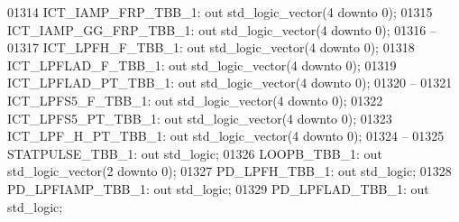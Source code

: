 \begin{DoxyCode}
01314         ICT\_IAMP\_FRP\_TBB\_1: \textcolor{keywordflow}{out} \textcolor{comment}{std\_logic\_vector}(\textcolor{vhdllogic}{}\textcolor{vhdllogic}{4} \textcolor{keywordflow}{downto} \textcolor{vhdllogic}{}\textcolor{vhdllogic}{0});
01315         ICT\_IAMP\_GG\_FRP\_TBB\_1:  \textcolor{keywordflow}{out} \textcolor{comment}{std\_logic\_vector}(\textcolor{vhdllogic}{}\textcolor{vhdllogic}{4} \textcolor{keywordflow}{downto} \textcolor{vhdllogic}{}\textcolor{vhdllogic}{0});
01316 \textcolor{keyword}{        --}
01317         ICT\_LPFH\_F\_TBB\_1:   \textcolor{keywordflow}{out} \textcolor{comment}{std\_logic\_vector}(\textcolor{vhdllogic}{}\textcolor{vhdllogic}{4} \textcolor{keywordflow}{downto} \textcolor{vhdllogic}{}\textcolor{vhdllogic}{0});
01318         ICT\_LPFLAD\_F\_TBB\_1: \textcolor{keywordflow}{out} \textcolor{comment}{std\_logic\_vector}(\textcolor{vhdllogic}{}\textcolor{vhdllogic}{4} \textcolor{keywordflow}{downto} \textcolor{vhdllogic}{}\textcolor{vhdllogic}{0});
01319         ICT\_LPFLAD\_PT\_TBB\_1:    \textcolor{keywordflow}{out} \textcolor{comment}{std\_logic\_vector}(\textcolor{vhdllogic}{}\textcolor{vhdllogic}{4} \textcolor{keywordflow}{downto} \textcolor{vhdllogic}{}\textcolor{vhdllogic}{0});
01320 \textcolor{keyword}{        --}
01321         ICT\_LPFS5\_F\_TBB\_1:  \textcolor{keywordflow}{out} \textcolor{comment}{std\_logic\_vector}(\textcolor{vhdllogic}{}\textcolor{vhdllogic}{4} \textcolor{keywordflow}{downto} \textcolor{vhdllogic}{}\textcolor{vhdllogic}{0});
01322         ICT\_LPFS5\_PT\_TBB\_1: \textcolor{keywordflow}{out} \textcolor{comment}{std\_logic\_vector}(\textcolor{vhdllogic}{}\textcolor{vhdllogic}{4} \textcolor{keywordflow}{downto} \textcolor{vhdllogic}{}\textcolor{vhdllogic}{0});
01323         ICT\_LPF\_H\_PT\_TBB\_1: \textcolor{keywordflow}{out} \textcolor{comment}{std\_logic\_vector}(\textcolor{vhdllogic}{}\textcolor{vhdllogic}{4} \textcolor{keywordflow}{downto} \textcolor{vhdllogic}{}\textcolor{vhdllogic}{0});
01324 \textcolor{keyword}{        --}
01325         STATPULSE\_TBB\_1:    \textcolor{keywordflow}{out} \textcolor{comment}{std\_logic};
01326         LOOPB\_TBB\_1:        \textcolor{keywordflow}{out} \textcolor{comment}{std\_logic\_vector}(\textcolor{vhdllogic}{}\textcolor{vhdllogic}{2} \textcolor{keywordflow}{downto} \textcolor{vhdllogic}{}\textcolor{vhdllogic}{0});
01327         PD\_LPFH\_TBB\_1:      \textcolor{keywordflow}{out} \textcolor{comment}{std\_logic};
01328         PD\_LPFIAMP\_TBB\_1:   \textcolor{keywordflow}{out} \textcolor{comment}{std\_logic};
01329         PD\_LPFLAD\_TBB\_1:    \textcolor{keywordflow}{out} \textcolor{comment}{std\_logic};

\end{DoxyCode}
